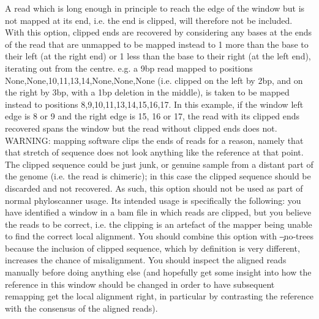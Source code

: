 \begin{itemize}
A read which is long enough in principle to reach the edge of the window but is not mapped at its end, i.e.
the end is clipped, will therefore not be included.
With this option, clipped ends are recovered by considering any bases at the ends of the read that are unmapped to be mapped instead to 1 more than the base to their left (at the right end) or 1 less than the base to their right (at the left end), iterating out from the centre.
e.g. a 9bp read mapped to positions None,None,10,11,13,14,None,None,None (i.e. clipped on the left by 2bp, and on the right by 3bp, with a 1bp deletion in the middle), is taken to be mapped instead to positions 8,9,10,11,13,14,15,16,17.
In this example, if the window left edge is 8 or 9 and the right edge is 15, 16 or 17, the read with its clipped ends recovered spans the window but the read without clipped ends does not.
WARNING: mapping software clips the ends of reads for a reason, namely that that stretch of sequence does not look anything like the reference at that point.
The clipped sequence could be just junk, or genuine sample from a distant part of the genome (i.e. the read is chimeric); in this case the clipped sequence should be discarded and not recovered.
As such, this option should not be used as part of normal phyloscanner usage.
Its intended usage is specifically the following: you have identified a window in a bam file in which reads are clipped, but you believe the reads to be correct, i.e. the clipping is an artefact of the mapper being unable to find the correct local alignment.
You should combine this option with \c{--no-trees} because the inclusion of clipped sequence, which by definition is very different, increases the chance of misalignment.
You should inspect the aligned reads manually before doing anything else (and hopefully get some insight into how the reference in this window should be changed in order to have subsequent remapping get the local alignment right, in particular by contrasting the reference with the consensus of the aligned reads).
\end{itemize}

